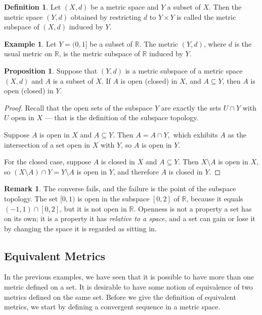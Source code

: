 \documentclass[11pt,a4paper]{article}
\theoremstyle{definition}
\newtheorem{defn}[thm]{Definition}
\newtheorem{exa}[thm]{Example}
\newtheorem{prop}[thm]{Proposition}
\newtheorem*{remark}{Remark}
\begin{document}
\begin{defn}
Let $(X,d)$ be a metric space and $Y$ a subset of $X$. Then the metric space $(Y,d)$ obtained by restricting $d$ to $Y\times Y$ is called the metric subspace of $(X,d)$ induced by $Y$.
\end{defn}


\begin{exa}
Let $Y=(0,1]$ be a subset of $\mathbb{R}$. The metric $(Y,d)$, where $d$ is the usual metric on $\mathbb{R}$, is the metric subspace of $\mathbb{R}$ induced by $Y$.
\end{exa}

\begin{prop}
Suppose that $(Y,d)$ is a metric subspace of a metric space $(X,d)$ and $A$ is a subset of $X$. If $A$ is open (closed) in $X$, and $A\subseteq Y$, then $A$ is open (closed) in $Y$.
\end{prop}

\begin{proof}
Recall that the open sets of the subspace $Y$ are exactly the sets $U\cap Y$
with $U$ open in $X$ --- that is the definition of the subspace topology.

Suppose $A$ is open in $X$ and $A\subseteq Y$. Then $A = A\cap Y,$ which exhibits $A$ as the intersection of a set open in $X$ with $Y$, so $A$ is open in $Y$.

For the closed case, suppose $A$ is closed in $X$ and $A\subseteq Y$. Then $X\setminus A$ is open in $X$, so $\left(X\setminus A\right)\cap Y = Y\setminus A$ is open in $Y$, and therefore $A$ is closed in $Y$.
\end{proof}


\begin{remark}
The converse fails, and the failure is the point of the subspace topology. The set $[0,1)$ is open in the subspace $[0,2]$ of $\mathbb{R}$, because it equals $(-1,1)\cap[0,2]$, but it is not open in $\mathbb{R}$. Openness is not a property a set has on its own; it is a property it has \emph{relative to a space}, and a set can gain or lose it by changing the space it is regarded as sitting in.
\end{remark}










\subsection{Equivalent Metrics}
In the previous examples, we have seen that it is possible to have more than one metric defined on a set. It is desirable to have some notion of equivalence of two metrics defined on the same set. Before we give the definition of equivalent metrics, we start by defining a convergent sequence in a metric space.
\end{document}
